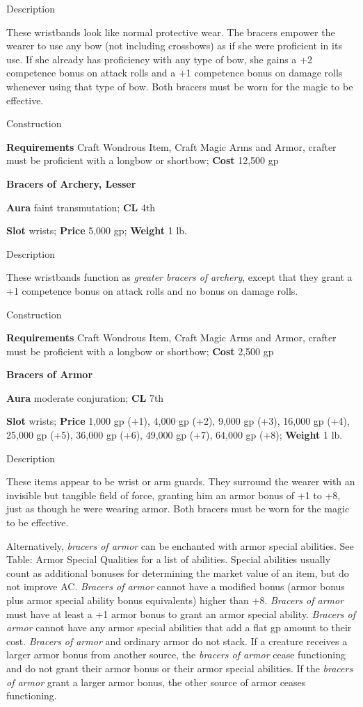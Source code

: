 Description
				
These wristbands look like normal protective wear. The bracers empower the wearer to use any bow (not including crossbows) as if she were proficient in its use. If she already has proficiency with any type of bow, she gains a +2 competence bonus on attack rolls and a +1 competence bonus on damage rolls whenever using that type of bow. Both bracers must be worn for the magic to be effective. 
				
Construction
				
\textbf{Requirements} Craft Wondrous Item, Craft Magic Arms and Armor, crafter must be proficient with a longbow or shortbow; \textbf{Cost }12,500 gp
				
\textbf{Bracers of Archery, Lesser}
				
\textbf{Aura} faint transmutation;\textbf{ CL }4th
				
\textbf{Slot} wrists; \textbf{Price} 5,000 gp; \textbf{Weight} 1 lb.
				
Description
				
These wristbands function as \textit{greater bracers of archery}, except that they grant a +1 competence bonus on attack rolls and no bonus on damage rolls. 
				
Construction
				
\textbf{Requirements} Craft Wondrous Item, Craft Magic Arms and Armor, crafter must be proficient with a longbow or shortbow; \textbf{Cost }2,500 gp
				
\textbf{Bracers of Armor}
				
\textbf{Aura} moderate conjuration;\textbf{ CL }7th
				
\textbf{Slot} wrists; \textbf{Price} 1,000 gp (+1), 4,000 gp (+2), 9,000 gp (+3), 16,000 gp (+4), 25,000 gp (+5), 36,000 gp (+6), 49,000 gp (+7), 64,000 gp (+8); \textbf{Weight} 1 lb.
				
Description
				
These items appear to be wrist or arm guards. They surround the wearer with an invisible but tangible field of force, granting him an armor bonus of +1 to +8, just as though he were wearing armor. Both bracers must be worn for the magic to be effective. 
				
Alternatively, \textit{bracers of armor} can be enchanted with armor special abilities. See Table: Armor Special Qualities for a list of abilities. Special abilities usually count as additional bonuses for determining the market value of an item, but do not improve AC. \textit{Bracers of armor} cannot have a modified bonus (armor bonus plus armor special ability bonus equivalents) higher than +8. \textit{Bracers of armor} must have at least a +1 armor bonus to grant an armor special ability. \textit{Bracers of armor }cannot have any armor special abilities that add a flat gp amount to their cost. \textit{Bracers of armor} and ordinary armor do not stack. If a creature receives a larger armor bonus from another source, the \textit{bracers of armor} cease functioning and do not grant their armor bonus or their armor special abilities. If the \textit{bracers of armor} grant a larger armor bonus, the other source of armor ceases functioning.
				
